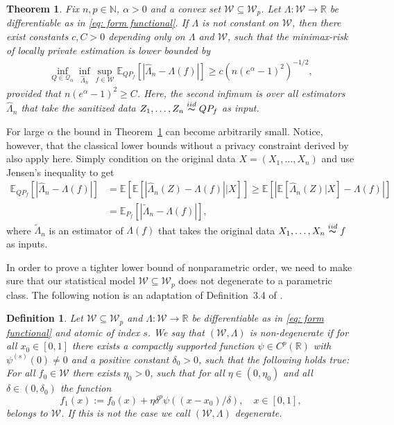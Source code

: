 \documentclass[preprint]{imsart}
\newcommand{\R}{{\mathbb R}}
\newcommand{\E}{{\mathbb E}}
\newcommand{\N}{{\mathbb N}}
\newtheorem{theorem}{Theorem}[section]
\newtheorem{definition}{Definition}
\numberwithin{equation}{section}
\newcounter{cond}
\begin{document}
\begin{theorem} \label{thm:LBparam}
Fix $n,p\in\N$, $\alpha>0$ and a convex set $\mathcal W\subseteq \mathcal W_p$. Let $\Lambda:\mathcal W \to \mathbb R$ be differentiable as in \eqref{eq: form functional}. If $\Lambda$ is not constant on $\mathcal W$, then there exist constants $c,C>0$ depending only on $\Lambda$ and $\mathcal W$, such that the minimax-risk of locally private estimation is lower bounded by
\begin{align*}
\inf_{Q\in\mathcal Q_\alpha} \inf_{\hat{\Lambda}_n} \sup_{f\in\mathcal W} \E_{QP_f}\left[|\hat{\Lambda}_n - \Lambda(f)|\right] \ge c \left(n(e^\alpha-1)^2\right)^{-1/2},
\end{align*}
provided that $n(e^\alpha-1)^2\ge C$. Here, the second infimum is over all estimators $\hat{\Lambda}_n$ that take the sanitized data $Z_1,\dots, Z_n \stackrel{iid}{\thicksim} QP_f$ as input.
\end{theorem}


For large $\alpha$ the bound in Theorem~\ref{thm:LBparam} can become arbitrarily small. Notice, however, that the classical lower bounds without a privacy constraint derived by \cite{GoldsteinMesser92} also apply here. Simply condition on the original data $X=(X_1,\dots, X_n)$ and use Jensen's inequality to get
\begin{align*}
\E_{QP_f}\left[|\hat{\Lambda}_n - \Lambda(f)|\right]
&=
\E\left[\E\left[|\hat{\Lambda}_n(Z) - \Lambda(f)|\Big|X\right]\right]
\ge
\E\left[\left|\E\left[\hat{\Lambda}_n(Z)\Big|X\right] - \Lambda(f)\right|\right]\\
&=
\E_{P_f}\left[\left| \tilde{\Lambda}_n - \Lambda(f)\right|\right],
\end{align*}
where $\tilde{\Lambda}_n$ is an estimator of $\Lambda(f)$ that takes the original data $X_1,\dots, X_n \stackrel{iid}{\thicksim} f$ as inputs.

In order to prove a tighter lower bound of nonparametric order, we need to make sure that our statistical model $\mathcal W\subseteq\mathcal W_p$ does not degenerate to a parametric class. The following notion is an adaptation of Definition~3.4 of \cite{GoldsteinMesser92}.

\begin{definition}\label{def:ND}
    Let $\mathcal W\subseteq \mathcal W_p$ and $\Lambda:\mathcal W \to \mathbb R$ be differentiable as in \eqref{eq: form functional} and atomic of index $s$. We say that $(\mathcal W, \Lambda)$ is \emph{non-degenerate} if for all $x_0\in[0,1]$ there exists a compactly supported function $\psi\in C^p(\R)$ with $\psi^{(s)}(0)\neq 0$ and a positive constant $\delta_0>0$, such that the following holds true: For all $f_0\in\mathcal W$ there exists $\eta_0>0$, such that for all $\eta\in(0,\eta_0)$ and all $\delta\in(0,\delta_0)$ the function
    $$
    f_1(x) := f_0(x) + \eta\delta^p\psi((x-x_0)/\delta), \quad x\in[0,1],
    $$
    belongs to $\mathcal W$. If this is not the case we call $(\mathcal W,\Lambda)$ \emph{degenerate}.
\end{definition}
\end{document}
